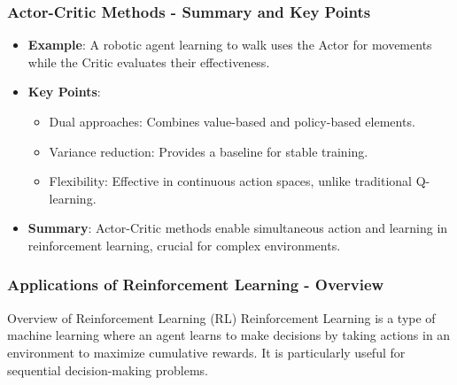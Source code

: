 \documentclass[aspectratio=169]{beamer}
\begin{document}
\begin{frame}[fragile]
    \frametitle{Actor-Critic Methods - Summary and Key Points}
    \begin{itemize}
        \item \textbf{Example}: A robotic agent learning to walk uses the Actor for movements while the Critic evaluates their effectiveness.
        \item \textbf{Key Points}:
            \begin{itemize}
                \item Dual approaches: Combines value-based and policy-based elements.
                \item Variance reduction: Provides a baseline for stable training.
                \item Flexibility: Effective in continuous action spaces, unlike traditional Q-learning.
            \end{itemize}
        \item \textbf{Summary}: Actor-Critic methods enable simultaneous action and learning in reinforcement learning, crucial for complex environments.
    \end{itemize}
\end{frame}

\begin{frame}[fragile]
    \frametitle{Applications of Reinforcement Learning - Overview}
    \begin{block}{Overview of Reinforcement Learning (RL)}
        Reinforcement Learning is a type of machine learning where an agent learns to make decisions by taking actions in an environment to maximize cumulative rewards. It is particularly useful for sequential decision-making problems.
    \end{block}
\end{frame}
\end{document}
